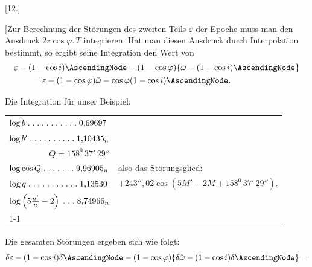 \clearpage
\begin{landscape}
\begingroup
\fontsize{10}{13}\selectfont
{}
\renewcommand{\headrulewidth}{0pt}
\begin{center}[12.]\end{center}
\par\noindent\hspace*{\parindent}[Zur Berechnung der Störungen des zweiten Teils \(\varepsilon\) der Epoche muss man den Ausdruck \(2r\cos\varphi\mathord{.}\,T\) integrieren. Hat man diesen Ausdruck durch Interpolation bestimmt, so ergibt seine Integration den Wert von
\[
\begin{aligned}
&\varepsilon-(1-\cos i)\AscendingNode-(1-\cos\varphi)\{\tilde\omega-(1-\cos i)\AscendingNode\}\\
&\qquad=\varepsilon-(1-\cos\varphi)\tilde\omega-\cos\varphi(1-\cos i)\AscendingNode.
\end{aligned}
\]
\par\noindent Die Integration für unser Beispiel:
\begingroup
\newcommand{\VTwelvePoint}{\mathord{.}\mkern5mu}
\newcommand{\VTwelveFive}{\VTwelvePoint\VTwelvePoint\VTwelvePoint\VTwelvePoint\VTwelvePoint}
\begin{center}
\begin{tabular}{@{}l@{\quad}l@{}}
\(\log b\;\VTwelveFive\VTwelveFive\VTwelvePoint0{,}69697\)&\\
\(\log b'\;\VTwelveFive\VTwelveFive1{,}10435_n\)&\\
\multicolumn{1}{r}{\(Q=158^0\,37'\,29''\)}&\\
\(\log\cos Q\;\VTwelveFive\VTwelvePoint\VTwelvePoint9{,}96905_n\)&also das Störungsglied:\\
\(\log q\;\VTwelveFive\VTwelveFive\VTwelvePoint1{,}13530\)&\(+243''{,}02\cos(5M'-2M+158^0\,37'\,29'').\)\\
\(\log\left(5\frac{n'}{n}-2\right)\;\VTwelvePoint\VTwelvePoint\VTwelvePoint8{,}74966_n\)&\\
\cline{1-1}
\multicolumn{1}{r}{\(2{,}38564_n\)}&
\end{tabular}
\end{center}
\endgroup
\par\noindent\hspace*{\parindent}Die gesamten Störungen ergeben sich wie folgt:
\[
\delta\varepsilon-(1-\cos i)\delta\AscendingNode-(1-\cos\varphi)\{\delta\tilde\omega-(1-\cos i)\delta\AscendingNode\}=
\]
\begingroup

\end{landscape}
